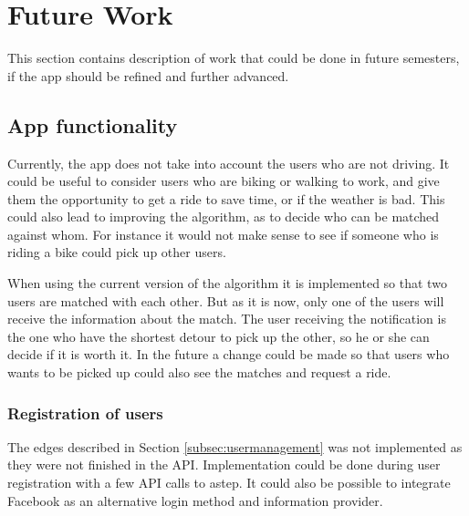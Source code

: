 \section{Future Work}\label{sec:future}
This section contains description of work that could be done in future semesters, if the app should be refined and further advanced.

\subsection{App functionality}
Currently, the app does not take into account the users who are not driving.
It could be useful to consider users who are biking or walking to work, and give them the opportunity to get a ride to save time, or if the weather is bad.
This could also lead to improving the algorithm, as to decide who can be matched against whom.
For instance it would not make sense to see if someone who is riding a bike could pick up other users.

When using the current version of the algorithm it is implemented so that two users are matched with each other.
But as it is now, only one of the users will receive the information about the match.
The user receiving the notification is the one who have the shortest detour to pick up the other, so he or she can decide if it is worth it. 
In the future a change could be made so that users who wants to be picked up could also see the matches and request a ride.


\subsubsection*{Registration of users}
The edges described in Section \ref{subsec:usermanagement} was not implemented as they were not finished in the API.
Implementation could be done during user registration with a few API calls to \gls{astep}.
It could also be possible to integrate Facebook as an alternative login method and information provider.

